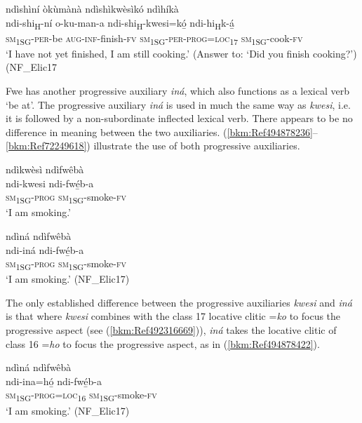 \ea
\label{bkm:Ref72249558}
ndìshìní òkùmànà ndìshìkwèsìkó ndìhíkà\\
\gll ndi-shi\textsubscript{H}-ní  o-ku-man-a    ndi-shi\textsubscript{H}-kwesi=kó̲    ndi-hi\textsubscript{H}k-á̲\\
\textsc{sm}\textsubscript{1SG}-\textsc{per}-be  \textsc{aug}-\textsc{inf}-finish-\textsc{fv}  \textsc{sm}\textsubscript{1SG}-\textsc{per}-\textsc{prog}=\textsc{loc}\textsubscript{17}  \textsc{sm}\textsubscript{1SG}-cook-\textsc{fv}\\
\glt ‘I have not yet finished, I am still cooking.’ (Answer to: ‘Did you finish cooking?’) (NF\_Elic17
\z

Fwe has another progressive auxiliary \textit{iná}, which also functions as a lexical verb ‘be at’. The progressive auxiliary \textit{iná} is used in much the same way as \textit{kwesi}, i.e. it is followed by a non-subordinate inflected lexical verb. There appears to be no difference in meaning between the two auxiliaries. (\ref{bkm:Ref494878236}--\ref{bkm:Ref72249618}) illustrate the use of both progressive auxiliaries.

\ea
\label{bkm:Ref494878236}
ndìkwèsì ndìfwêbà\\
\gll ndi-kwesi  ndi-fwé̲b-a\\
\textsc{sm}\textsubscript{1SG}-\textsc{prog}  \textsc{sm}\textsubscript{1SG}-smoke-\textsc{fv}\\
\glt ‘I am smoking.’
\z

\ea
\label{bkm:Ref72249618}
ndìná ndìfwêbà\\
\gll ndi-iná  ndi-fwé̲b-a\\
\textsc{sm}\textsubscript{1SG}-\textsc{prog}  \textsc{sm}\textsubscript{1SG}-smoke-\textsc{fv}\\
\glt ‘I am smoking.’ (NF\_Elic17)
\z

The only established difference between the progressive auxiliaries \textit{kwesi} and \textit{iná} is that where \textit{kwesi} combines with the class 17 locative clitic =\textit{ko} to focus the progressive aspect (see (\ref{bkm:Ref492316669})), \textit{iná} takes the locative clitic of class 16 =\textit{ho} to focus the progressive aspect, as in (\ref{bkm:Ref494878422}).

\ea
\label{bkm:Ref494878422}
ndìná ndìfwêbà\\
\gll ndi-ina=hó̲    ndi-fwé̲b-a\\
\textsc{sm}\textsubscript{1SG}-\textsc{prog}=\textsc{loc}\textsubscript{16}  \textsc{sm}\textsubscript{1SG}-smoke-\textsc{fv}\\
\glt ‘I am smoking.’ (NF\_Elic17)
\z

